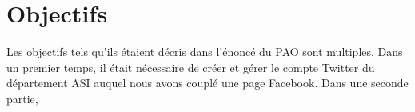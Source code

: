 \section{Objectifs}
Les objectifs tels qu'ils étaient décris dans l'énoncé du PAO sont multiples. Dans un premier temps, il était nécessaire de créer et gérer le compte Twitter du département ASI auquel nous 
avons couplé une page Facebook. Dans une seconde partie, 
